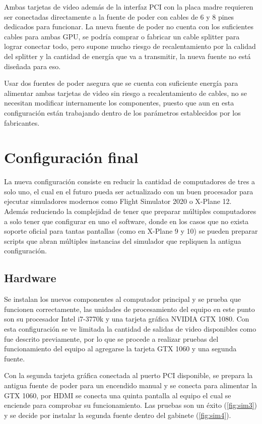 Ambas tarjetas de video además de la interfaz PCI con la placa madre requieren ser conectadas directamente a la fuente de poder con cables de 6 y 8 pines dedicados para funcionar. La nueva fuente de poder no cuenta con los suficientes cables para ambas GPU, se podría comprar o fabricar un cable splitter para lograr conectar todo, pero supone mucho riesgo de recalentamiento por la calidad del splitter y la cantidad de energía que va a transmitir, la nueva fuente no está diseñada para eso.  

Usar dos fuentes de poder asegura que se cuenta con suficiente energía para alimentar ambas tarjetas de video sin riesgo a recalentamiento de cables, no se necesitan modificar internamente los componentes, puesto que aun en esta configuración están trabajando dentro de los parámetros establecidos por los fabricantes.

\section{Configuración final}

La nueva configuración consiste en reducir la cantidad de computadores de tres a solo uno, el cual en el futuro pueda ser actualizado con un buen procesador para ejecutar simuladores modernos como Flight Simulator 2020 o X-Plane 12. Además reduciendo la complejidad de tener que preparar múltiples computadores a solo tener que configurar en uno el software, donde en los casos que no exista soporte oficial para tantas pantallas (como en X-Plane 9 y 10) se pueden preparar scripts que abran múltiples instancias del simulador que repliquen la antigua configuración.

\subsection{Hardware}

Se instalan los nuevos componentes al computador principal y se prueba que funcionen correctamente, las unidades de procesamiento del equipo en este punto son su procesador Intel i7-3770k y una tarjeta gráfica NVIDIA GTX 1080. Con esta configuración se ve limitada la cantidad de salidas de video disponibles como fue descrito previamente, por lo que se procede a realizar pruebas del funcionamiento del equipo al agregarse la tarjeta GTX 1060 y una segunda fuente.

Con la segunda tarjeta gráfica conectada al puerto PCI disponible, se prepara la antigua fuente de poder para un encendido manual \cite{psumanual} y se conecta para alimentar la GTX 1060, por HDMI se conecta una quinta pantalla al equipo el cual se enciende para comprobar su funcionamiento. Las pruebas son un éxito (\ref{fig:sim3}) y se decide por instalar la segunda fuente dentro del gabinete (\ref{fig:sim4}).

